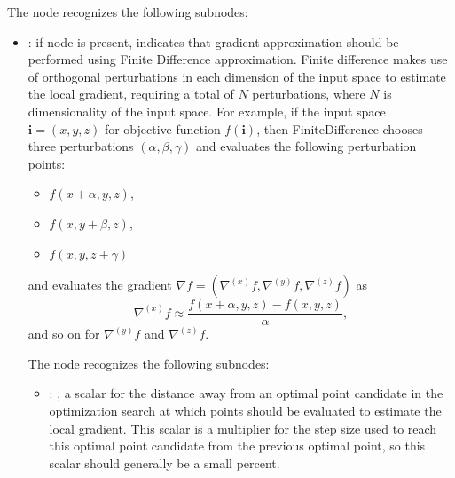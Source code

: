 \begin{itemize}
      The  node recognizes the following subnodes:
      \begin{itemize}
        \item {}:
          if node is present, indicates that gradient approximation should be performed
          using Finite Difference approximation. Finite difference makes use of orthogonal
          perturbations         in each dimension of the input space to estimate the local gradient,
          requiring a total of $N$         perturbations, where $N$ is dimensionality of the input
          space. For example, if the input space         $\mathbf{i} = (x, y, z)$ for objective
          function $f(\mathbf{i})$, then FiniteDifference chooses         three perturbations
          $(\alpha, \beta, \gamma)$ and evaluates the following perturbation points:
          \begin{itemize}           \item $f(x+\alpha, y, z)$,           \item $f(x, y+\beta, z)$,
          \item $f(x, y, z+\gamma)$         \end{itemize}         and evaluates the gradient $\nabla
          f = (\nabla^{(x)} f, \nabla^{(y)} f, \nabla^{(z)} f)$ as         \begin{equation*}
          \nabla^{(x)}f \approx \frac{f(x+\alpha, y, z) - f(x, y, z)}{\alpha},
          \end{equation*}         and so on for $ \nabla^{(y)}f$ and $\nabla^{(z)}f$.

          The  node recognizes the following subnodes:
          \begin{itemize}
            \item {}: ,
              a scalar for the distance away from an optimal point candidate in the optimization
              search at which points should be evaluated to estimate the local gradient. This scalar
              is a         multiplier for the step size used to reach this optimal point candidate
              from the previous         optimal point, so this scalar should generally be a small
              percent. 
          \end{itemize}


\end{itemize}
\end{itemize}
